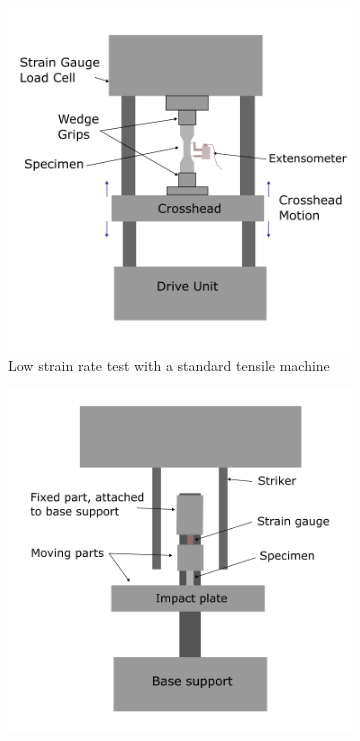 \begin{figure}
        \centering
    
        \begin{subfigure}[b]{0.45\textwidth}
        \centering
        \includegraphics[width=\textwidth]{Images/chapter1/uniaxialtension.png}
        \caption{Low strain rate test with a standard tensile machine}
        \label{fig:subfiglow}
        \end{subfigure}
        \hfill
        \begin{subfigure}[b]{0.45\textwidth}
        \centering
        \includegraphics[width=\textwidth]{Images/chapter1/uniaxialintermediate.png}

\end{subfigure}
\end{figure}
